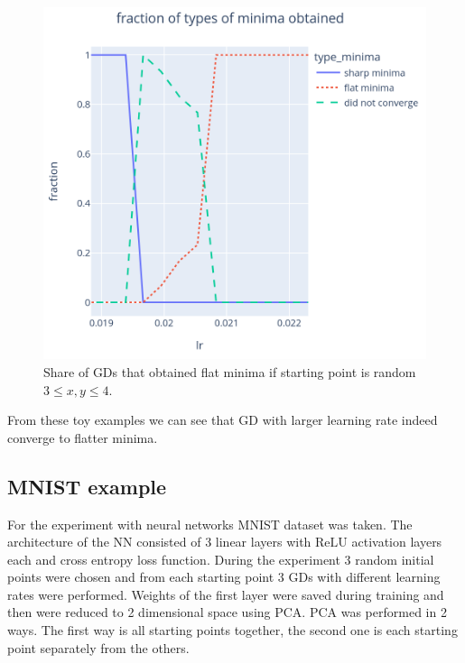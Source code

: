 \documentclass{article}
\theoremstyle{definition}
\begin{document}
\begin{figure}[H]
    \begin{center}
        \caption{Share of GDs that obtained flat minima if starting point is random $3 \leq x, y \leq 4$.}
        \includegraphics[scale=0.3]{2d_example_lr_vs_minima.png}        
    \end{center}
\end{figure}

From these toy examples we can see that GD with larger learning rate 
indeed converge to flatter minima. 

\subsection{MNIST example}
For the experiment with neural networks MNIST dataset was taken. 
The architecture of the NN consisted of 3 linear layers with $\mathrm{ReLU}$ 
activation layers each and cross entropy loss function.
During the experiment 3 random initial points were chosen and from each starting point 
3 GDs with different learning rates were performed. 
Weights of the first layer were saved during training and 
then were reduced to 2 dimensional space using PCA. 
PCA was performed in 2 ways.
The first way is all starting points together, 
the second one is each starting point separately from the others. 
\end{document}
